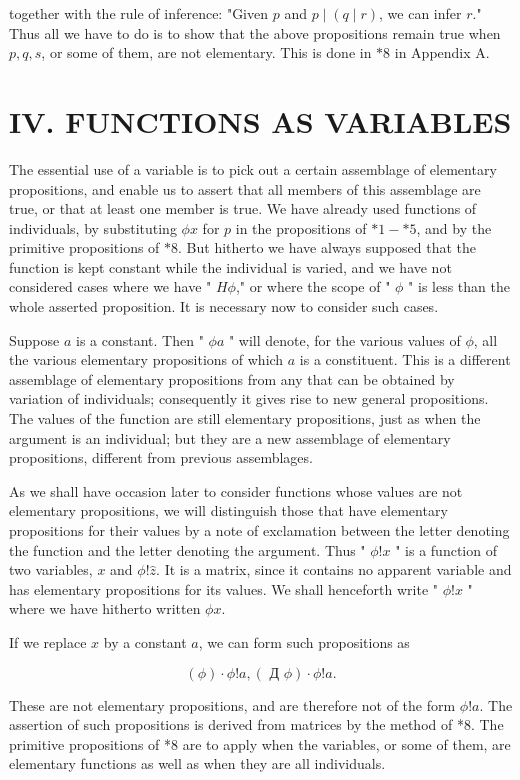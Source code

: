 \documentclass[10pt]{article}
\begin{document}
together with the rule of inference: "Given $p$ and $p \mid(q \mid r)$, we can infer $r$."\\
Thus all we have to do is to show that the above propositions remain true when $p, q, s$, or some of them, are not elementary. This is done in $* 8$ in Appendix A.

\section*{IV. FUNCTIONS AS VARIABLES}
The essential use of a variable is to pick out a certain assemblage of elementary propositions, and enable us to assert that all members of this assemblage are true, or that at least one member is true. We have already used functions of individuals, by substituting $\phi x$ for $p$ in the propositions of $* 1-* 5$, and by the primitive propositions of $* 8$. But hitherto we have always supposed that the function is kept constant while the individual is varied, and we have not considered cases where we have " $H \phi$," or where the scope of " $\phi$ " is less than the whole asserted proposition. It is necessary now to consider such cases.

Suppose $a$ is a constant. Then " $\phi a$ " will denote, for the various values of $\phi$, all the various elementary propositions of which $a$ is a constituent. This is a different assemblage of elementary propositions from any that can be obtained by variation of individuals; consequently it gives rise to new general propositions. The values of the function are still elementary propositions, just as when the argument is an individual; but they are a new assemblage of elementary propositions, different from previous assemblages.

As we shall have occasion later to consider functions whose values are not elementary propositions, we will distinguish those that have elementary propositions for their values by a note of exclamation between the letter denoting the function and the letter denoting the argument. Thus " $\phi!x$ " is a function of two variables, $x$ and $\phi!\hat{z}$. It is a matrix, since it contains no apparent variable and has elementary propositions for its values. We shall henceforth write " $\phi!x$ " where we have hitherto written $\phi x$.

If we replace $x$ by a constant $a$, we can form such propositions as

$$
(\phi) \cdot \phi!a,(\text { Д } \phi) \cdot \phi!a .
$$

These are not elementary propositions, and are therefore not of the form $\phi!a$. The assertion of such propositions is derived from matrices by the method of *8. The primitive propositions of *8 are to apply when the variables, or some of them, are elementary functions as well as when they are all individuals.
\end{document}

